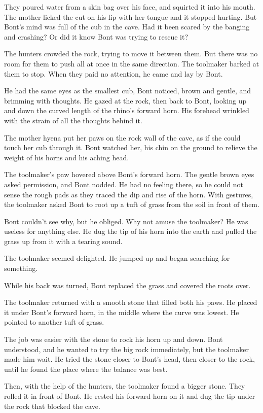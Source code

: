 They poured water from a skin bag over his face, and squirted it into his mouth. The mother licked the cut on his lip with her tongue and it stopped hurting. But Bont's mind was full of the cub in the cave. Had it been scared by the banging and crashing? Or did it know Bont was trying to rescue it?

The hunters crowded the rock, trying to move it between them. But there was no room for them to push all at once in the same direction. The toolmaker barked at them to stop. When they paid no attention, he came and lay by Bont.

He had the same eyes as the smallest cub, Bont noticed, brown and gentle, and brimming with thoughts. He gazed at the rock, then back to Bont, looking up and down the curved length of the rhino's forward horn. His forehead wrinkled with the strain of all the thoughts behind it.

The mother hyena put her paws on the rock wall of the cave, as if she could touch her cub through it. Bont watched her, his chin on the ground to relieve the weight of his horns and his aching head.

The toolmaker's paw hovered above Bont's forward horn. The gentle brown eyes asked permission, and Bont nodded. He had no feeling there, so he could not sense the rough pads as they traced the dip and rise of the horn. With gestures, the toolmaker asked Bont to root up a tuft of grass from the soil in front of them.

Bont couldn't see why, but he obliged. Why not amuse the toolmaker? He was useless for anything else. He dug the tip of his horn into the earth and pulled the grass up from it with a tearing sound.

The toolmaker seemed delighted. He jumped up and began searching for something.

While his back was turned, Bont replaced the grass and covered the roots over.

The toolmaker returned with a smooth stone that filled both his paws. He placed it under Bont's forward horn, in the middle where the curve was lowest. He pointed to another tuft of grass.

The job was easier with the stone to rock his horn up and down. Bont understood, and he wanted to try the big rock immediately, but the toolmaker made him wait. He tried the stone closer to Bont's head, then closer to the rock, until he found the place where the balance was best.

Then, with the help of the hunters, the toolmaker found a bigger stone. They rolled it in front of Bont. He rested his forward horn on it and dug the tip under the rock that blocked the cave.

